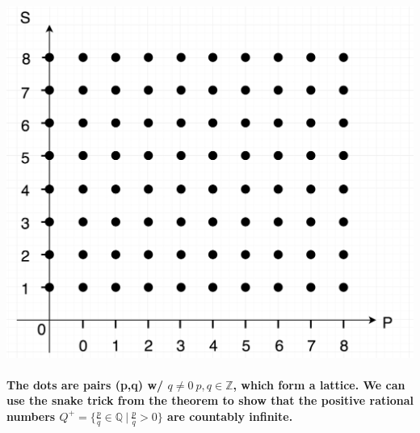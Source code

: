 \documentclass[10pt,a4paper]{article}
\begin{document}
\includegraphics[scale=0.15]{images/2}

\paragraph{The dots are pairs (p,q) w/ $q \neq 0 \ p,q \in \mathbb{Z}$, which form a lattice. We can use the snake trick from the theorem to show that the positive rational numbers $Q^{+} =  \lbrace \frac{p}{q} \in \mathbb{Q} \ | \ \frac{p}{q} > 0\rbrace$ are countably infinite.}
\paragraph{}
\end{document}
